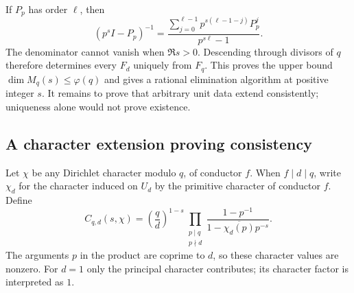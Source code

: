 \documentclass[11pt]{article}
\theoremstyle{definition}
\theoremstyle{remark}
\begin{document}
If $P_p$ has order $\ell$, then
\begin{equation}\label{eq:prime-inverse}
 (p^sI-P_p)^{-1}
  =\frac{\displaystyle\sum_{j=0}^{\ell-1}p^{s(\ell-1-j)}P_p^j}
         {p^{s\ell}-1}.
\end{equation}
The denominator cannot vanish when $\Re s>0$. Descending through divisors of $q$ therefore determines every $F_d$ uniquely from $F_q$. This proves the upper bound $\dim M_q(s)\leq\varphi(q)$ and gives a rational elimination algorithm at positive integer $s$. It remains to prove that arbitrary unit data extend consistently; uniqueness alone would not prove existence.

\subsection{A character extension proving consistency}
Let $\chi$ be any Dirichlet character modulo $q$, of conductor $f$. When $f\mid d\mid q$, write $\chi_d$ for the character induced on $U_d$ by the primitive character of conductor $f$. Define
\begin{equation}\label{eq:Cqd}
 C_{q,d}(s,\chi)=\left(\frac qd\right)^{1-s}
       \prod_{\substack{p\mid q\\p\nmid d}}
       \frac{1-p^{-1}}{1-\overline{\chi_d(p)}p^{-s}}.
\end{equation}
The arguments $p$ in the product are coprime to $d$, so these character values are nonzero. For $d=1$ only the principal character contributes; its character factor is interpreted as $1$.
\end{document}
